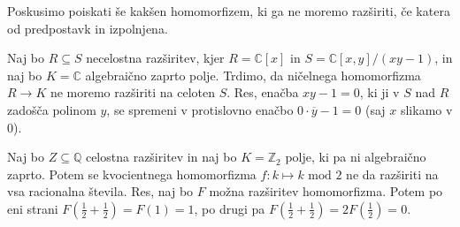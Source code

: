 \documentclass[a4paper, 12pt]{article}
\newcommand{\Z}{\mathbb{Z}}
\newcommand{\Q}{\mathbb{Q}}
\newcommand{\C}{\mathbb{C}}
\begin{document}
Poskusimo poiskati še kakšen homomorfizem, ki ga ne moremo razširiti, če katera od predpostavk in izpolnjena.

Naj bo $R\subseteq S$ necelostna razširitev, kjer $R = \C[x]$ in $S = \C[x, y]/(xy-1)$, in naj bo $K = \C$ algebraično zaprto polje. Trdimo, da ničelnega homomorfizma $R \to K$ ne moremo razširiti na celoten $S$. Res, enačba $xy - 1 = 0$, ki ji v $S$ nad $R$ zadošča polinom $y$, se spremeni v protislovno enačbo $0 \cdot \overline{y} - 1 = 0$ (saj $x$ slikamo v $0$).

Naj bo $Z \subseteq \Q$ celostna razširitev in naj bo $K = \Z_2$ polje, ki pa ni algebraično zaprto. Potem se kvocientnega homomorfizma $f \colon k \mapsto k \text{ mod } 2$ ne da razširiti na vsa racionalna števila. Res, naj bo $F$ možna razširitev homomorfizma. Potem po eni strani $F(\frac{1}{2} + \frac{1}{2}) = F(1) = 1$, po drugi pa $F(\frac{1}{2} + \frac{1}{2}) = 2F(\frac{1}{2}) = 0$.
\end{document}
